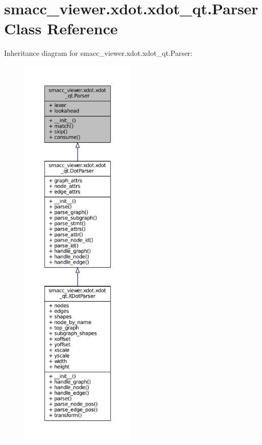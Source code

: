 \hypertarget{classsmacc__viewer_1_1xdot_1_1xdot__qt_1_1Parser}{}\section{smacc\+\_\+viewer.\+xdot.\+xdot\+\_\+qt.\+Parser Class Reference}
\label{classsmacc__viewer_1_1xdot_1_1xdot__qt_1_1Parser}


Inheritance diagram for smacc\+\_\+viewer.\+xdot.\+xdot\+\_\+qt.\+Parser\+:
\nopagebreak
\begin{figure}[H]
\begin{center}
\leavevmode
\includegraphics[height=550pt]{classsmacc__viewer_1_1xdot_1_1xdot__qt_1_1Parser__inherit__graph}
\end{center}
\end{figure}


